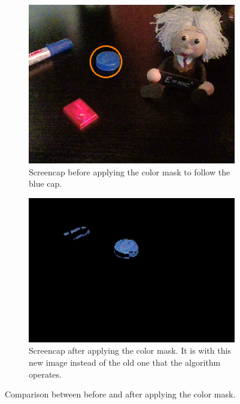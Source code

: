 \begin{figure}[H]
\centering
	\begin{subfigure}{.4\textwidth}
		\centering
		\includegraphics[width=\textwidth]{Imagenes/color1.png}
		\caption{Screencap before applying the color mask to follow the blue cap.}
		\label{fig:col1}
	\end{subfigure}
	\begin{subfigure}{.4\textwidth}
		\centering
		\includegraphics[width=\textwidth]{Imagenes/color2.png}
		\caption{Screencap after applying the color mask. It is with this new image instead of the old one that the algorithm operates.}
		\label{fig:col2}
	\end{subfigure}
	\caption{Comparison between before and after applying the color mask.}
	\label{fig:color_comp}
\end{figure}
